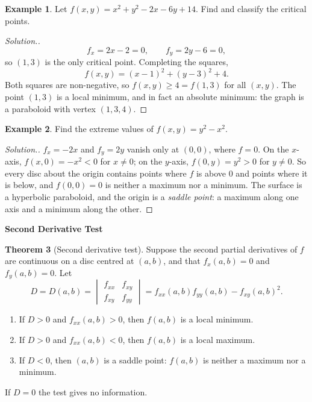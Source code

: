 \documentclass[11pt,a4paper]{article}
\theoremstyle{definition}
\newtheorem{thm}{Theorem}[subsection]
\newtheorem{exa}[thm]{Example}
\newenvironment{solution}
  {\renewcommand{\qedsymbol}{}\begin{proof}[\textit{Solution}.]}
  {\end{proof}}
\newcommand{\subhead}[1]{%
  \par\medskip\noindent\textbf{#1}\par\nobreak\smallskip}
\begin{document}
\begin{exa}
\label{ex:completesquare}
Let $f(x,y) = x^2 + y^2 - 2x -6y + 14$. Find and classify the critical points.
\end{exa}

\begin{solution}
\[f_x = 2x -2 = 0 ,\qquad f_y = 2y - 6 =0 ,\]
so $(1,3)$ is the only critical point. Completing the squares,
\[f(x,y) = (x-1)^2 + (y-3)^2 + 4 .\]
Both squares are non-negative, so $f(x,y)\geq 4 = f(1,3)$ for all $(x,y)$. The
point $(1,3)$ is a local minimum, and in fact an absolute minimum: the graph is a
paraboloid with vertex $(1,3,4)$.
\end{solution}

\begin{exa}
\label{ex:saddle}
Find the extreme values of $f(x,y) = y^2 - x^2$.
\end{exa}

\begin{solution}
$f_x = -2x$ and $f_y = 2y$ vanish only at $(0,0)$, where $f = 0$. On the
$x$-axis, $f(x,0) = -x^2 <0$ for $x\neq 0$; on the $y$-axis, $f(0,y) = y^2> 0$
for $y\neq 0$. So every disc about the origin contains points where $f$ is above
$0$ and points where it is below, and $f(0,0) = 0$ is neither a maximum nor a
minimum. The surface is a hyperbolic paraboloid, and the origin is a
\emph{saddle point}: a maximum along one axis and a minimum along the other.
\end{solution}

\subhead{Second Derivative Test}

\begin{thm}[Second derivative test]
\label{thm:secondderiv}
Suppose the second partial derivatives of $f$ are continuous on a disc centred at
$(a,b)$, and that $f_x(a,b)=0$ and $f_y(a,b) =0$. Let
\[D = D(a,b) = \begin{vmatrix} f_{xx} & f_{xy}\\ f_{xy} & f_{yy}\end{vmatrix} =
f_{xx}(a,b)f_{yy}(a,b) -f_{xy}(a,b)^2 .\]
\begin{enumerate}
\item If $D> 0$ and $f_{xx}(a,b)>0$, then $f(a,b)$ is a local minimum.

\item If $D>0$ and $f_{xx}(a,b)<0$, then $f(a,b)$ is a local maximum.

\item If $D<0$, then $(a,b)$ is a saddle point: $f(a,b)$ is neither a maximum
nor a minimum.
\end{enumerate}
If $D = 0$ the test gives no information.
\end{thm}
\end{document}
